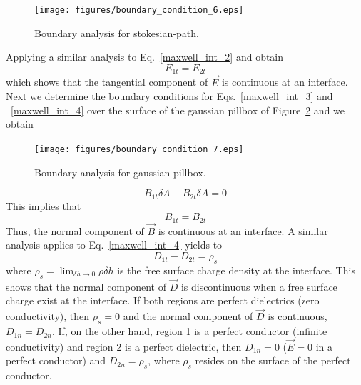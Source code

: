 \documentclass[11pt,a4paper,oneside]{book}
\numberwithin{equation}{section}
\theoremstyle{it}
\theoremstyle{definition}
\begin{document}
\begin{figure}[H]
	\centering
	\texttt{[image: figures/boundary\_condition\_6.eps]}
	\captionsetup{width=0.75\textwidth}		
	\caption{Boundary analysis for stokesian-path.}
	\label{boundary_condition_2}
\end{figure}
Applying a similar analysis to Eq.~\eqref{maxwell_int_2} and obtain
\begin{equation}\label{continuity_E}
	E_{1t} = E_{2t}
\end{equation}
which shows that the tangential component of $\vec{E}$ is continuous at an interface. Next we determine the boundary conditions for Eqs.~\eqref{maxwell_int_3} and ~\eqref{maxwell_int_4} over the surface of the gaussian pillbox of Figure~\ref{boundary_condition_3} and we obtain
\begin{figure}[H]
	\centering
	\texttt{[image: figures/boundary\_condition\_7.eps]}
	\captionsetup{width=0.75\textwidth}		
	\caption{Boundary analysis for gaussian pillbox.}
	\label{boundary_condition_3}
\end{figure}
\begin{equation*}\label{}
	B_{1t}\delta A - B_{2t}\delta A = 0
\end{equation*}
This implies that
\begin{equation}\label{continuity_B}
	B_{1t} = B_{2t}
\end{equation}
Thus, the normal component of $\vec{B}$ is continuous at an interface. A similar analysis applies to Eq.~\eqref{maxwell_int_4} yields to
\begin{equation}\label{continuity_D}
	D_{1t} - D_{2t} = \rho_s
\end{equation}
where $\rho_{s} = \lim_{\delta h\rightarrow 0}\rho\delta h$ is the free  surface charge density at the interface. This shows that the normal component of $\vec{D}$ is discontinuous when a free surface charge exist at the interface. If both regions are perfect dielectrics (zero conductivity), then $\rho_s=0$ and the normal component of $\vec{D}$ is continuous, $D_{1n} = D_{2n}$. If, on the other hand, region 1 is a perfect conductor (infinite conductivity) and region 2 is a perfect dielectric, then $D_{1n} = 0$ ($\vec{E}=0$ in a perfect conductor) and $D_{2n} = \rho_{s}$, where $\rho_{s}$ resides on the surface of the perfect conductor.
\end{document}
